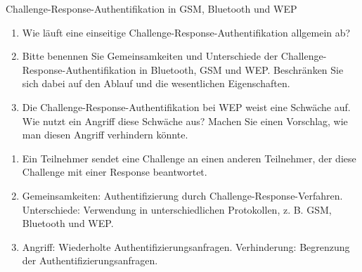 \documentclass{article}
\begin{document}
\begin{exercise}{Challenge-Response-Authentifikation in GSM, Bluetooth und WEP}
  \begin{enumerate}
    \item Wie läuft eine einseitige Challenge-Response-Authentifikation allgemein ab?
    \item Bitte benennen Sie Gemeinsamkeiten und Unterschiede der Challenge-Response-Authentifikation in Bluetooth, GSM und WEP. Beschränken Sie sich dabei auf den Ablauf und die wesentlichen Eigenschaften.
    \item Die Challenge-Response-Authentifikation bei WEP weist eine Schwäche auf. Wie nutzt ein Angriff diese Schwäche aus? Machen Sie einen Vorschlag, wie man diesen Angriff verhindern könnte.
  \end{enumerate}

  \begin{solution}
    \begin{enumerate}
      \item Ein Teilnehmer sendet eine Challenge an einen anderen Teilnehmer, der diese Challenge mit einer Response beantwortet.
      \item Gemeinsamkeiten: Authentifizierung durch Challenge-Response-Verfahren. Unterschiede: Verwendung in unterschiedlichen Protokollen, z. B. GSM, Bluetooth und WEP.
      \item Angriff: Wiederholte Authentifizierungsanfragen. Verhinderung: Begrenzung der Authentifizierungsanfragen.
    \end{enumerate}
  \end{solution}
\end{exercise}
\end{document}
